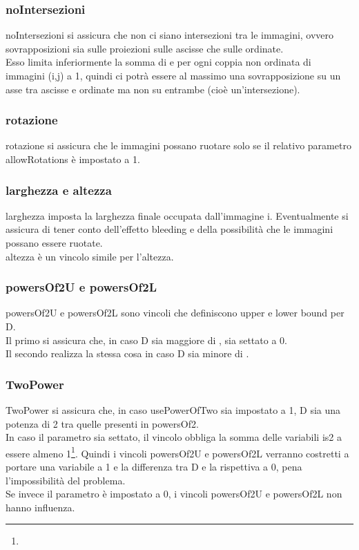 \subsubsection{noIntersezioni}
noIntersezioni si assicura che non ci siano intersezioni tra le immagini, ovvero sovrapposizioni sia sulle proiezioni sulle ascisse che sulle ordinate. \\
Esso limita inferiormente la somma di \beforeXij{} e \beforeYij{} per ogni coppia non ordinata di immagini (i,j) a 1, quindi ci potrà essere al massimo una sovrapposizione su un asse tra ascisse e ordinate ma non su entrambe (cioè un'intersezione).

\begin{sloppypar}
\subsubsection{rotazione}
rotazione si assicura che le immagini possano ruotare solo se il relativo parametro \mbox{allowRotations} è impostato a 1.
\end{sloppypar}





\subsubsection{larghezza e altezza}
larghezza imposta la larghezza finale occupata dall'immagine i. Eventualmente si assicura di tener conto dell'effetto bleeding e della possibilità che le immagini possano essere ruotate. \\
altezza è un vincolo simile per l'altezza.


\subsubsection{powersOf2U e powersOf2L}
powersOf2U e powersOf2L sono vincoli che definiscono upper e lower bound per D. \\
Il primo si assicura che, in caso D sia maggiore di \powersOfTp{}, \isTp{} sia settato a 0. \\
Il secondo realizza la stessa cosa in caso D sia minore di \powersOfTp. 

\subsubsection{TwoPower}
TwoPower si assicura che, in caso usePowerOfTwo sia impostato a 1, D sia una potenza di 2 tra quelle presenti in powersOf2. \\
In caso il parametro sia settato, il vincolo obbliga la somma delle variabili is2 a essere almeno 1\footnote{\footIsTSum}.
Quindi i vincoli powersOf2U e powersOf2L verranno costretti a portare una variabile \isTp{} a 1 e la differenza tra D e la rispettiva \powersOfTp{} a 0, pena l'impossibilità del problema. \\
Se invece il parametro è impostato a 0, i vincoli powersOf2U e powersOf2L non hanno influenza.



\newpage